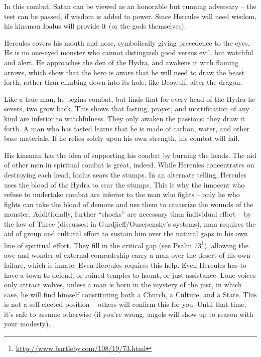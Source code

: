 In this combat, Satan can be viewed as an honorable but cunning adversary -- the test can be passed, if wisdom is added to power. Since Hercules will need wisdom, his kinsman Ioalus will provide it (or the gods themselves).

Hercules covers his mouth and nose, symbolically giving precedence to the eyes. He is no one-eyed monster who cannot distinguish good versus evil, but watchful and alert. He approaches the den of the Hydra, and awakens it with flaming arrows, which show that the hero is aware that he will need to draw the beast forth, rather than climbing down into its hole, like Beowulf, after the dragon.

Like a true man, he begins combat, but finds that for every head of the Hydra he severs, two grow back. This shows that fasting, prayer, and mortification of any kind are inferior to watchfulness. They only awaken the passions: they draw it forth. A man who has fasted learns that he is made of carbon, water, and other base materials. If he relies solely upon his own strength, his combat will fail.

His kinsman has the idea of supporting his combat by burning the heads. The aid of other men in spiritual combat is great, indeed. While Hercules concentrates on destroying each head, Ioalus sears the stumps. In an alternate telling, Hercules uses the blood of the Hydra to sear the stumps. This is why the innocent who refuse to undertake combat are inferior to the man who fights -- only he who fights can take the blood of demons and use them to cauterize the wounds of the monster. Additionally, further ``shocks'' are necessary than individual effort -- by the law of Three (discussed in Gurdjieff/Ousepensky's systems), man requires the aid of group and cultural effort to sustain him over the natural gaps in his own line of spiritual effort. They fill in the critical gap (see Psalm 73\footnote{\url{http://www.bartleby.com/108/19/73.html}}), allowing the awe and wonder of external comradeship carry a man over the desert of his own failure, which is innate. Even Hercules requires this help. Even Hercules has to have a town to defend, or ruined temples to haunt, or just assistance. Lone voices only attract wolves, unless a man is born in the mystery of the just, in which case, he will find himself constituting both a Church, a Culture, and a State. This is not a self-elected position -- others will confirm this for you. Until that time, it's safe to assume otherwise (if you're wrong, angels will show up to reason with your modesty).

